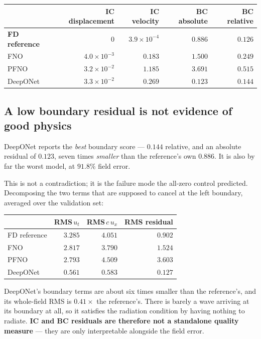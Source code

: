 \documentclass[11pt,a4paper]{article}
\begin{document}
\begin{center}
\small
\begin{tabular}{lrrrr}
\toprule
& \textbf{IC displacement} & \textbf{IC velocity} & \textbf{BC absolute} & \textbf{BC relative}\\
\midrule
\textbf{FD reference} & $0$ & $3.9\times10^{-4}$ & $0.886$ & $0.126$\\
\midrule
FNO      & $4.0\times10^{-3}$ & $0.183$ & $1.500$ & $0.249$\\
PFNO     & $3.2\times10^{-2}$ & $1.185$ & $3.691$ & $0.515$\\
DeepONet & $3.3\times10^{-2}$ & $0.269$ & $0.123$ & $\mathbf{0.144}$\\
\bottomrule
\end{tabular}
\end{center}

\subsection{A low boundary residual is not evidence of good physics}

DeepONet reports the \emph{best} boundary score --- $0.144$ relative, and an
absolute residual of $0.123$, seven times \emph{smaller} than the reference's
own $0.886$. It is also by far the worst model, at $91.8\%$ field error.

This is not a contradiction; it is the failure mode the all-zero control
predicted. Decomposing the two terms that are supposed to cancel at the left
boundary, averaged over the validation set:

\begin{center}
\small
\begin{tabular}{lrrr}
\toprule
& \textbf{RMS}\,$u_t$ & \textbf{RMS}\,$c\,u_x$ & \textbf{RMS residual}\\
\midrule
FD reference & $3.285$ & $4.051$ & $0.902$\\
FNO          & $2.817$ & $3.790$ & $1.524$\\
PFNO         & $2.793$ & $4.509$ & $3.603$\\
DeepONet     & $\mathbf{0.561}$ & $\mathbf{0.583}$ & $0.127$\\
\bottomrule
\end{tabular}
\end{center}

\noindent DeepONet's boundary terms are about six times smaller than the
reference's, and its whole-field RMS is $0.41\times$ the reference's. There is
barely a wave arriving at its boundary at all, so it satisfies the radiation
condition by having nothing to radiate. \textbf{IC and BC residuals are
therefore not a standalone quality measure} --- they are only interpretable
alongside the field error.
\end{document}
